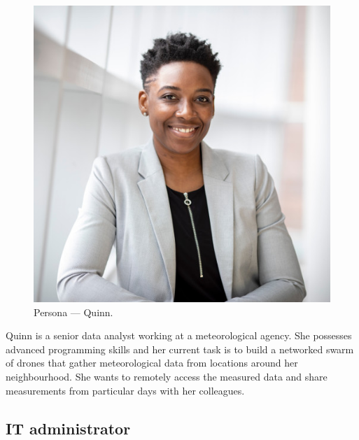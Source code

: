 \documentclass[thesis=M,english,hidelinks]{FITthesisXE}[2012/06/26]
\begin{document}
\begin{figure}[ht]
\centering
\includegraphics[scale=0.15]{persona_quinn}
\caption{Persona --- Quinn.}
\label{fig:persona_quinn}
\end{figure}

Quinn is a senior data analyst working at a meteorological agency. She possesses advanced programming skills and her current task is to build a networked swarm of drones that gather meteorological data from locations around her neighbourhood. She wants to remotely access the measured data and share measurements from particular days with her colleagues.

\subsection{IT administrator}
\end{document}
